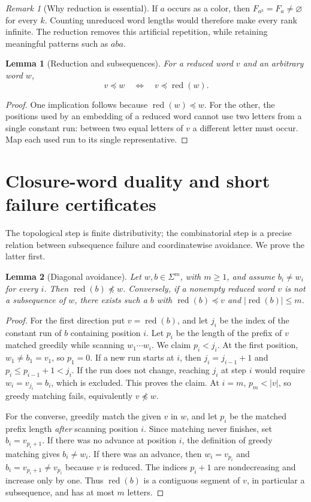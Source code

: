 \documentclass[11pt,letterpaper]{article}
\numberwithin{equation}{section}
\newtheorem{lemma}[lemma]{Lemma}
\theoremstyle{definition}
\theoremstyle{remark}
\newtheorem{remark}[remark]{Remark}
\theoremstyle{definition}
\newcommand{\red}{\operatorname{red}}
\newcommand{\len}[1]{\lvert #1\rvert}
\begin{document}
\begin{remark}[Why reduction is essential]
If $a$ occurs as a color, then $F_{a^k}=F_a\ne\varnothing$ for every $k$.
Counting unreduced word lengths would therefore make every rank infinite.
The reduction removes this artificial repetition, while retaining meaningful
patterns such as $aba$.
\end{remark}

\begin{lemma}[Reduction and subsequences]\label{cw:lem:stutter}
For a reduced word $v$ and an arbitrary word $w$,
\[
 v\preceq w\quad\Longleftrightarrow\quad v\preceq\red(w).
\]
\end{lemma}
\begin{proof}
One implication follows because $\red(w)\preceq w$. For the other, the
positions used by an embedding of a reduced word cannot use two letters
from a single constant run: between two equal letters of $v$ a different
letter must occur. Map each used run to its single representative.
\end{proof}

\section{Closure-word duality and short failure certificates}
\label{cw:sec:duality}

The topological step is finite distributivity; the combinatorial step is a
precise relation between subsequence failure and coordinatewise avoidance.
We prove the latter first.

\begin{lemma}[Diagonal avoidance]\label{cw:lem:diagonal}
Let $w,b\in\Sigma^m$, with $m\ge1$, and assume $b_i\ne w_i$ for every $i$.
Then $\red(b)\not\preceq w$.
Conversely, if a nonempty reduced word $v$ is not a subsequence of $w$, there
exists such a $b$ with $\red(b)\preceq v$ and
$\len{\red(b)}\le m$.
\end{lemma}
\begin{proof}
For the first direction put $v=\red(b)$, and let $j_i$ be the index of the
constant run of $b$ containing position $i$. Let $p_i$ be the length of the
prefix of $v$ matched greedily while scanning $w_1\cdots w_i$.
We claim $p_i<j_i$. At the first position, $w_1\ne b_1=v_1$, so $p_1=0$.
If a new run starts at $i$, then $j_i=j_{i-1}+1$ and $p_i\le p_{i-1}+1<j_i$.
If the run does not change, reaching $j_i$ at step $i$ would require
$w_i=v_{j_i}=b_i$, which is excluded. This proves the claim. At $i=m$,
$p_m<\len v$, so greedy matching fails, equivalently $v\not\preceq w$.

For the converse, greedily match the given $v$ in $w$, and let $p_i$ be the
matched prefix length \emph{after} scanning position $i$. Since matching
never finishes, set $b_i=v_{p_i+1}$. If there was no advance at position $i$,
the definition of greedy matching gives $b_i\ne w_i$. If there was an
advance, then $w_i=v_{p_i}$ and $b_i=v_{p_i+1}\ne v_{p_i}$ because $v$ is
reduced. The indices $p_i+1$ are nondecreasing and increase only by one.
Thus $\red(b)$ is a contiguous segment of $v$, in particular a subsequence,
and has at most $m$ letters.
\end{proof}
\end{document}
